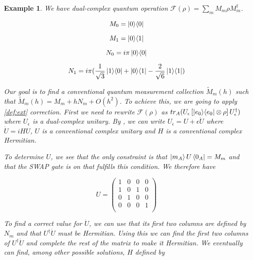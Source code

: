 \documentclass{article}
\newtheorem{example}[theorem]{Example}
\newcommand{\e}{\epsilon}
\newcommand{\F}{\mathcal{F}}
\newcommand{\til}{\widetilde}
\newcommand\ketbra[2]{\ket{#1}\!\bra{#2}}
\begin{document}
\begin{example}
We have dual-complex quantum operation $\F(\rho) = \sum_m M_m \rho M_m^\dagger$.

\begin{multicols}{2}
\noindent \begin{equation}
 M_0 = \ketbra 0 0
\end{equation}

\noindent \begin{equation}
 M_1 = \ketbra 0 1
\end{equation}

\columnbreak

\noindent \begin{equation}
 N_0 = i \pi \ketbra 0 0
\end{equation}

\noindent \begin{equation}
 N_1 = i \pi (\frac 1 {\sqrt 3} \ketbra 1 0 + \ketbra 0 1 - \frac 2 {\sqrt 6} \ketbra 1 1)
\end{equation}
\end{multicols}

Our goal is to find a conventional quantum measurement collection $\til M_m(h)$ such that $\til M_m(h) = M_m + h N_m + O(h^2)$. To achieve this, we are going to apply \ref{def:ext} correction. First we need to rewrite $\F(\rho)$ as $tr_A(U_\e \left[ \ketbra{e_0}{e_0} \otimes \rho \right] U_\e^\dagger)$ where $U_\e$ is a dual-complex unitary. By \label{pr:unitary}, we can write $U_\e = U + \e \dot{U}$ where $\dot{U} = iHU$, $U$ is a conventional complex unitary and $H$ is a conventional complex Hermitian.

To determine $U$, we see that the only constraint is that $\ket{m_A} U \bra{0_A} = M_m$ and that the SWAP gate is on that fulfills this condition. We therefore have

\begin{equation}
 U = \begin{pmatrix}
        1 & 0 & 0 & 0 \\
        1 & 0 & 1 & 0 \\
        0 & 1 & 0 & 0 \\
        0 & 0 & 0 & 1 \\
     \end{pmatrix}
\end{equation}

To find a correct value for $\dot{U}$, we can use that its first two columns are defined by $N_m$ and that $U^\dagger\dot{U}$ must be Hermitian. Using this we can find the first two columns of $U^\dagger\dot{U}$ and complete the rest of the matrix to make it Hermitian. We eventually can find, among other possible solutions, $H$ defined by


\end{example}
\end{document}
